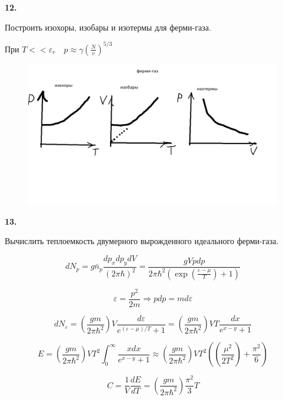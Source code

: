 \documentclass[a4paper,12pt]{article} %
\begin{document}
\begin{ttask}\textbf{12.} 
	
Построить изохоры, изобары и изотермы для ферми-газа. 

При $ T<<\varepsilon_{r} \quad p \approx \gamma\left(\frac{N}{v}\right)^{5 / 3} $




\begin{figure}[H]
	\centering
	\includegraphics[width=0.7\linewidth]{fermi_graphs}
	\caption{}
	\label{fig:fermigraphs}
\end{figure}












\end{ttask}


\begin{ttask}\textbf{13.} 

Вычислить теплоемкость двумерного вырожденного идеального ферми-газа. 




\[ dN_p = g \bar{n}_p \frac{d p_x d p_y d V }{(2\pi \hbar)^2}=
\frac{g V p dp}{2\pi \hbar^2 \left(\exp \left(\frac{\varepsilon-\mu }{T}\right)+1 \right) }
 \]

\[\varepsilon=\frac{p^2}{2m} \Rightarrow  p dp=m d \varepsilon\]

\[ dN_\varepsilon= \left(\frac{g m }{2\pi \hbar^2}\right) V \frac{d \varepsilon }{e^{(\varepsilon-\mu)/T}+1}=
\left(\frac{g m }{2\pi \hbar^2}\right) V T \frac{dx}{e^{x-y}+1}
\]

\[ E= \left(\frac{g m }{2\pi \hbar^2}\right) V T^2 \int_{0}^{\infty}\frac{x dx}{e^{x-y}+1} \approx
\left(\frac{g m }{2\pi \hbar^2}\right) V T^2 \left(  \left(\frac{\mu^2}{2T^2}\right)+\frac{\pi^2}{6}\right)\]


\[ C=\frac{1}{V}\frac{dE}{dT}=
\left(  \frac{g m }{2\pi \hbar^2}\right)\frac{\pi^2}{3} T\]














\end{ttask}
\end{document}
